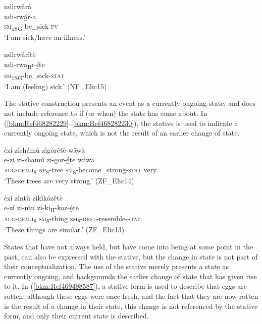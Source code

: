 \ea
\label{bkm:Ref99465046}
\glll ndìrwârà\\
ndi-rwá̲r-a\\
\textsc{sm}\textsubscript{1SG}-be\_sick-\textsc{fv}\\
\glt ‘I am sick/have an illness.’
\z

\ea
\label{bkm:Ref99465063}
\glll ndìrwárîtè\\
ndi-rwa\textsubscript{H}r-í̲te\\
\textsc{sm}\textsubscript{1SG}-be\_sick-\textsc{stat}\\
\glt ‘I am (feeling) sick.’ (NF\_Elic15)
\z

The stative construction presents an event as a currently ongoing state, and does not include reference to if (or when) the state has come about. In (\ref{bkm:Ref468282229}--\ref{bkm:Ref468282230}), the stative is used to indicate a currently ongoing state, which is not the result of an earlier change of state.

\ea
\label{bkm:Ref468282229}
èzí zìshámù zìgórêtè wâwà\\
\gll e-zi    zi-shamú  zi-gor-é̲te      wáwa\\
\textsc{aug}-\textsc{dem}.\textsc{i}\textsubscript{8}  \textsc{np}\textsubscript{8}-tree  \textsc{sm}\textsubscript{8}-become\_strong-\textsc{stat}  very\\
\glt ‘These trees are very strong.’ (ZF\_Elic14)
\z

\ea
\label{bkm:Ref468282230}
èzí zìntù zìkìkózêtè\\
\gll e-zí    zi-ntu    zi-ki\textsubscript{H}-koz-é̲te\\
\textsc{aug}-\textsc{dem}.\textsc{i}\textsubscript{8}  \textsc{sm}\textsubscript{8}-thing  \textsc{sm}\textsubscript{8}-\textsc{refl}-resemble-\textsc{stat}\\
\glt ‘These things are similar.’ (ZF\_Elic13)
\z

States that have not always held, but have come into being at some point in the past, can also be expressed with the stative, but the change in state is not part of their conceptualization. The use of the stative merely presents a state as currently ongoing, and backgrounds the earlier change of state that has given rise to it. In (\ref{bkm:Ref469498587}), a stative form is used to describe that eggs are rotten; although these eggs were once fresh, and the fact that they are now rotten is the result of a change in their state, this change is not referenced by the stative form, and only their current state is described.

